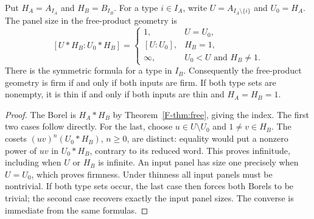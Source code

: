 \begin{proposition}\label{F-prop:panel}
Put $H_A=A_{I_A}$ and $H_B=B_{I_B}$. For a type $i\in I_A$,
write $U=A_{I_A\setminus\{i\}}$ and $U_0=H_A$.
The panel size in the free-product geometry is
\[
 [U*H_B:U_0*H_B]=
 \begin{cases}
 1,&U=U_0,\\
 [U:U_0],&H_B=1,\\
 \infty,&U_0<U\text{ and }H_B\ne1.
 \end{cases}
\]
There is the symmetric formula for a type in $I_B$. Consequently the
free-product geometry is firm if and only if both inputs are firm.
If both type sets are nonempty, it is thin if and only if both inputs
are thin and $H_A=H_B=1$.
\end{proposition}
\begin{proof}
The Borel is $H_A*H_B$ by Theorem~\ref{F-thm:free}, giving the index.
The first two cases follow directly. For the last, choose
$u\in U\setminus U_0$ and $1\ne v\in H_B$. The cosets
$(uv)^n(U_0*H_B)$, $n\geq0$, are distinct: equality would put a
nonzero power of $uv$ in $U_0*H_B$, contrary to its reduced word.
This proves infinitude, including when $U$ or $H_B$ is infinite.
An input panel has size one precisely when $U=U_0$, which proves
firmness. Under thinness all input panels must be nontrivial. If
both type sets occur, the last case then forces both Borels to be
trivial; the second case recovers exactly the input panel sizes.
The converse is immediate from the same formulas.
\end{proof}
